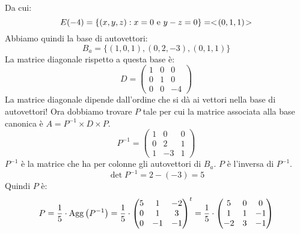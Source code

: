 \begin{exmp}
\[\]
Da cui:
\[
E(-4) = \{ (x,y,z) : x = 0 \text{ e } y - z = 0 \} = <\!{(0,1,1)}\!>
\]
Abbiamo quindi la base di autovettori:
\[
B_a = \{ (1,0,1), (0,2,-3), (0,1,1) \}
\]
La matrice diagonale rispetto a questa base \`e:
\[
D =
\begin{pmatrix}
1 & 0 & 0 \\
0 & 1 & 0 \\
0 & 0 & -4
\end{pmatrix}
\]
La matrice diagonale dipende dall'ordine che si d\`a ai vettori nella base di autovettori! Ora dobbiamo trovare $P$ tale per cui la matrice associata alla base canonica \`e $A = P^{-1} \times D \times P$.
\[
P^{-1} =
\begin{pmatrix}
1 & 0 & 0 \\ 
0 & 2 & 1 \\
1 & -3 & 1
\end{pmatrix}
\]
$P^{-1}$ \`e la matrice che ha per colonne gli autovettori di $B_a$. $P$ \`e l'inversa di $P^{-1}$.
\[
\det{P^{-1}} = 2 - (-3) = 5
\]
Quindi $P$ \`e:
\[
P = \frac{1}{5} \cdot \operatorname{Agg} \left( {P^{-1}} \right) = 
\frac{1}{5} \cdot 
{\begin{pmatrix}
5 & 1 & -2 \\
0 & 1 & 3 \\
0 & -1 & -1
\end{pmatrix}}^t =
\frac{1}{5} \cdot 
\begin{pmatrix}
5 & 0 & 0 \\
1 & 1 & -1 \\
-2 & 3 & -1
\end{pmatrix}
\]
\end{exmp}

